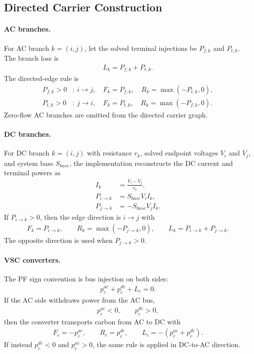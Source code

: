 \subsection{Directed Carrier Construction}

\paragraph{AC branches.}
For AC branch \(k=(i,j)\), let the solved terminal injections be
\(P_{f,k}\) and \(P_{t,k}\).  The branch loss is
\begin{align}
L_k = P_{f,k} + P_{t,k}.
\end{align}
The directed-edge rule is
\begin{align}
P_{f,k} > 0 &:\ i \rightarrow j,\quad F_k = P_{f,k},\quad R_k = \max(-P_{t,k}, 0), \\
P_{t,k} > 0 &:\ j \rightarrow i,\quad F_k = P_{t,k},\quad R_k = \max(-P_{f,k}, 0).
\end{align}
Zero-flow AC branches are omitted from the directed carrier graph.

\paragraph{DC branches.}
For DC branch \(k=(i,j)\) with resistance \(r_k\), solved endpoint voltages
\(V_i\) and \(V_j\), and system base \(S_{base}\), the implementation
reconstructs the DC current and terminal powers as
\begin{align}
I_k &= \frac{V_i - V_j}{r_k}, \\
P_{i\rightarrow k} &= S_{base} V_i I_k, \\
P_{j\rightarrow k} &= - S_{base} V_j I_k.
\end{align}
If \(P_{i\rightarrow k} > 0\), then the edge direction is \(i \rightarrow j\) with
\begin{align}
F_k = P_{i\rightarrow k},\qquad
R_k = \max(-P_{j\rightarrow k}, 0),\qquad
L_k = P_{i\rightarrow k} + P_{j\rightarrow k}.
\end{align}
The opposite direction is used when \(P_{j\rightarrow k} > 0\).

\paragraph{VSC converters.}
The PF sign convention is bus injection on both sides:
\begin{align}
p^{ac}_c + p^{dc}_c + L_c = 0.
\end{align}
If the AC side withdraws power from the AC bus,
\begin{align}
p^{ac}_c < 0,\qquad p^{dc}_c > 0,
\end{align}
then the converter transports carbon from AC to DC with
\begin{align}
F_c = -p^{ac}_c,\qquad R_c = p^{dc}_c,\qquad L_c = -(p^{ac}_c + p^{dc}_c).
\end{align}
If instead \(p^{dc}_c < 0\) and \(p^{ac}_c > 0\), the same rule is applied in
DC-to-AC direction.

